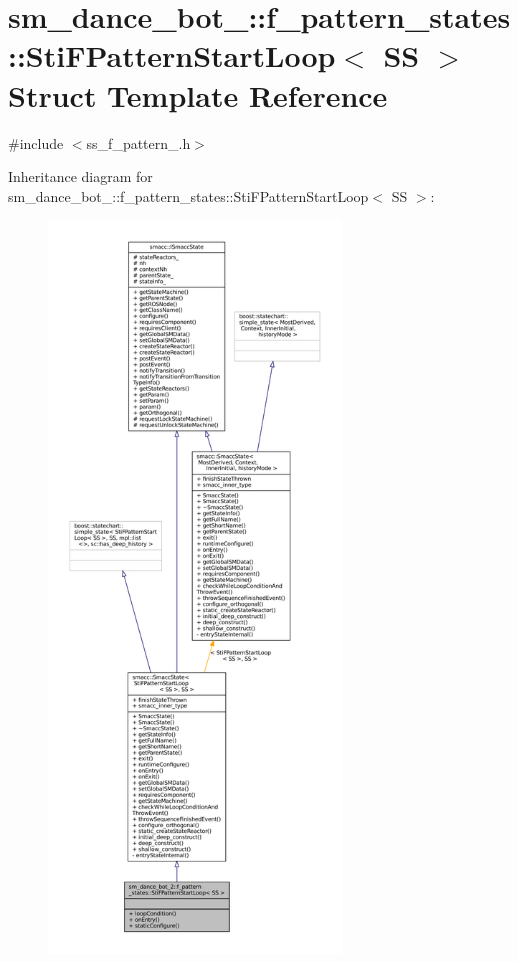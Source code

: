 \hypertarget{classsm__dance__bot__2_1_1f__pattern__states_1_1StiFPatternStartLoop}{}\section{sm\+\_\+dance\+\_\+bot\+\_\+:\+:f\+\_\+pattern\+\_\+states\+:\+:Sti\+F\+Pattern\+Start\+Loop$<$ SS $>$ Struct Template Reference}
\label{classsm__dance__bot__2_1_1f__pattern__states_1_1StiFPatternStartLoop}


{\ttfamily \#include $<$ss\+\_\+f\+\_\+pattern\+\_.\+h$>$}



Inheritance diagram for sm\+\_\+dance\+\_\+bot\+\_\+:\+:f\+\_\+pattern\+\_\+states\+:\+:Sti\+F\+Pattern\+Start\+Loop$<$ SS $>$\+:
\nopagebreak
\begin{figure}[H]
\begin{center}
\leavevmode
\includegraphics[height=550pt]{classsm__dance__bot__2_1_1f__pattern__states_1_1StiFPatternStartLoop__inherit__graph}
\end{center}
\end{figure}


